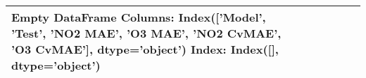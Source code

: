 \begin{tabular}{lllllll}
\toprule
Empty DataFrame
Columns: Index(['Model', 'Test', 'NO2 MAE', 'O3 MAE', 'NO2 CvMAE', 'O3 CvMAE'], dtype='object')
Index: Index([], dtype='object') \\
\bottomrule
\end{tabular}
